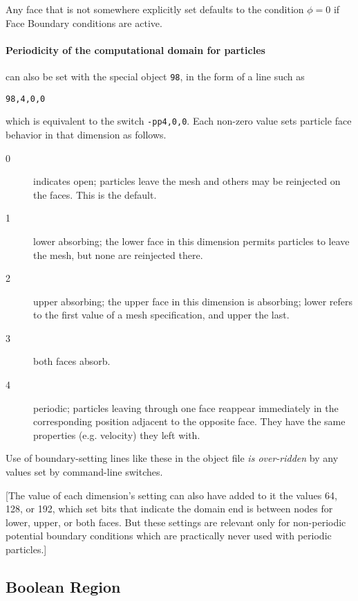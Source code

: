 \documentclass[12pt]{article}
\begin{document}
Any face that is not somewhere explicitly set defaults to the
condition $\phi=0$ if Face Boundary conditions are active.

\paragraph{Periodicity of the computational domain for
  particles}\label{partperiod} can
also be set with the special object \verb!98!, in the form of a line
such as
\begin{verbatim}
98,4,0,0
\end{verbatim} which is equivalent to the switch \verb!-pp4,0,0!.
Each non-zero value sets particle face behavior in that dimension as follows.

\begin{description}
\item[0]  indicates open; particles leave the mesh and others may be
reinjected on the faces. This is the default. 
\item[1] lower absorbing; the lower face in this dimension permits particles
to leave the mesh, but none are reinjected there.
\item[2] upper absorbing; the upper face in this dimension is absorbing;
lower refers to the first value of a mesh specification, and upper the
last.
\item[3] both faces absorb.
\item[4] periodic; particles leaving through one face reappear
  immediately in the corresponding position adjacent to the opposite
  face. They have the same properties (e.g. velocity) they left with.
\end{description}

Use of boundary-setting lines like these in the object file
\emph{is over-ridden} by any values set by command-line switches.

[The value of each dimension's setting can also have added to it the
values 64, 128, or 192, which set bits that indicate the domain end is
between nodes for lower, upper, or both faces. But these settings are
relevant only for non-periodic potential boundary conditions which are
practically never used with periodic particles.]




\subsection{Boolean Region}
\end{document}
